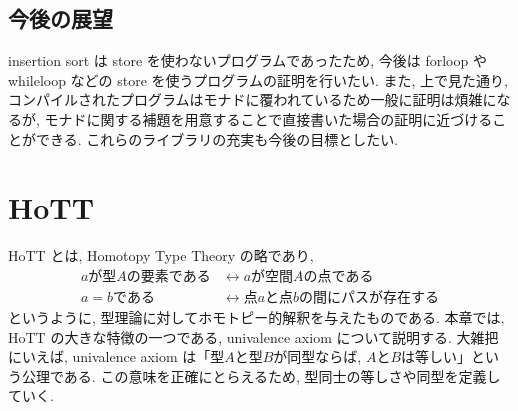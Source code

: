 \documentclass[11pt]{jarticle}
\theoremstyle{mystyle}
\newcommand{\0}{\textbf{0}}
\newcommand{\1}{\textbf{1}}
\newcommand{\2}{\textbf{2}}
\begin{document}
\subsection{今後の展望}
insertion sort は store を使わないプログラムであったため, 今後は forloop や whileloop などの store を使うプログラムの証明を行いたい. 
また, 上で見た通り, コンパイルされたプログラムはモナドに覆われているため一般に証明は煩雑になるが, モナドに関する補題を用意することで直接書いた場合の証明に近づけることができる. これらのライブラリの充実も今後の目標としたい. 
\section{HoTT}
HoTT とは, Homotopy Type Theory の略であり, 
\begin{align*}
  \text{$a$が型$A$の要素である} &\leftrightarrow \text{$a$が空間$A$の点である} \\
  \text{$a = b$である} &\leftrightarrow \text{点$a$と点$b$の間にパスが存在する}
\end{align*}
というように, 型理論に対してホモトピー的解釈を与えたものである. 本章では, HoTT の大きな特徴の一つである, univalence axiom について説明する. 大雑把にいえば, univalence axiom は「型$A$と型$B$が同型ならば, $A$と$B$は等しい」という公理である. この意味を正確にとらえるため, 型同士の等しさや同型を定義していく. 
\end{document}
